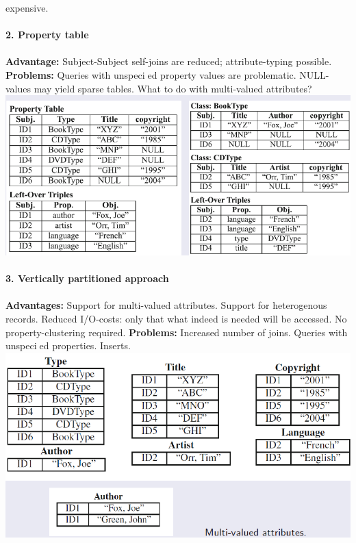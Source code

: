 \documentclass{article}
\begin{document}
expensive.\\\\
\textbf{2. Property table\\\\}
\textbf{Advantage:} Subject-Subject self-joins are reduced; attribute-typing possible. \textbf{Problems:} Queries with unspecied property values are problematic. NULL-values may yield sparse tables. What to do with multi-valued attributes?
\includegraphics[scale=0.6]{33.png}\\\\
\textbf{3. Vertically partitioned approach}\\\\
\textbf{Advantages:} Support for multi-valued attributes. Support for heterogenous records. Reduced I/O-costs: only that what indeed is needed will be accessed. No property-clustering required. \textbf{Problems: }Increased number of joins. Queries with unspecied properties. Inserts.\\
\includegraphics[scale=0.6]{34.png}\\
\end{document}
